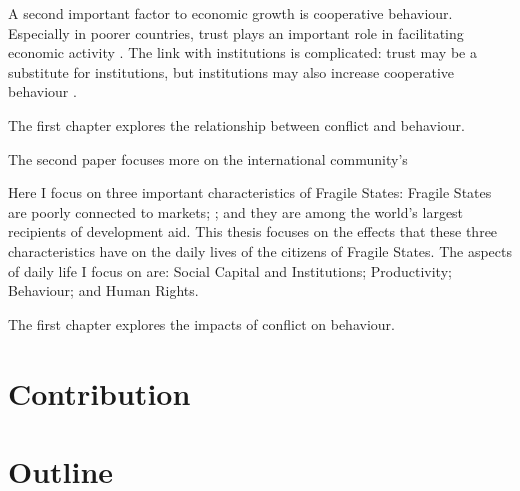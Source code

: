 A second important factor to economic growth is cooperative behaviour. Especially in poorer countries, trust plays an important role in facilitating economic activity \citep{Knack1997}. The link with institutions is complicated: trust may be a substitute for institutions, but institutions may also increase cooperative behaviour \cite{Bo2008}.








The first chapter explores the relationship between conflict and behaviour. %

The second paper focuses more on the international community's 
%


Here I focus on three important characteristics of Fragile States: Fragile States are poorly connected to markets; ; and they are among the world's largest recipients of development aid. This thesis focuses on the effects that these three characteristics have on the daily lives of the citizens of Fragile States. The aspects of daily life I focus on are: Social Capital and Institutions; Productivity; Behaviour; and Human Rights.

The first chapter explores the impacts of conflict on behaviour. 



\section{Contribution}


\section{Outline}


\clearpage 

